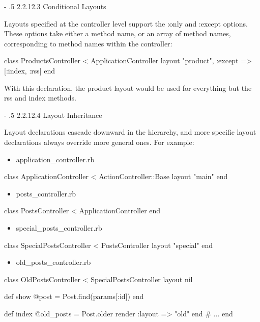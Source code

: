 \documentclass[10pt]{book}
\makeatletter
\renewcommand\paragraph{%
   \@startsection{paragraph}{4}{0mm}%
      {-\baselineskip}%
      {.5\baselineskip}%
      {\normalfont\scriptsize\bfseries}}
\newenvironment{code}{%
  \scriptsize
    \verbatim
}{%
    \endverbatim
    \newline
}
\makeatother
\begin{document}
\paragraph{2.2.12.3 Conditional Layouts}

Layouts specified at the controller level support the :only and :except  options. These options take either a method name, or an array of method  names, corresponding to method names within the controller:
\begin{code}
class ProductsController < ApplicationController
  layout "product", :except => [:index, :rss]
end
\end{code}

With this declaration, the product layout would be used for everything but the rss and index methods.

\paragraph{2.2.12.4 Layout Inheritance}

Layout declarations cascade downward in the hierarchy, and more  specific layout declarations always override more general ones. For  example:
\begin{itemize}
	\item application\_controller.rb
\end{itemize}
\begin{code}
class ApplicationController < ActionController::Base
  layout "main"
end
\end{code}
\begin{itemize}
	\item posts\_controller.rb
\end{itemize}
\begin{code}
class PostsController < ApplicationController
end
\end{code}
\begin{itemize}
	\item special\_posts\_controller.rb
\end{itemize}
\begin{code}
class SpecialPostsController < PostsController
  layout "special"
end
\end{code}
\begin{itemize}
	\item old\_posts\_controller.rb
\end{itemize}
\begin{code}
class OldPostsController < SpecialPostsController
  layout nil
 
  def show
    @post = Post.find(params[:id])
  end
 
  def index
    @old_posts = Post.older
    render :layout => "old"
  end
  # ...
end
\end{code}
\end{document}
